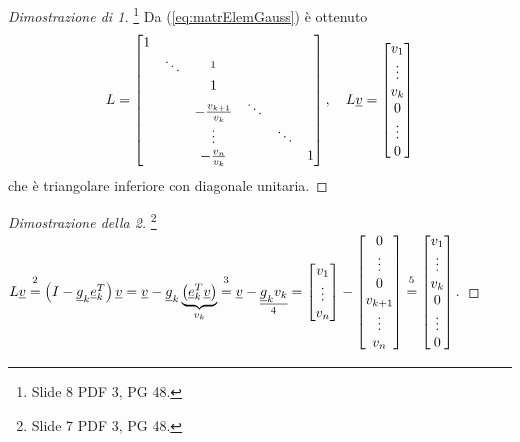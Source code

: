 \begin{proof}[Dimostrazione di 1]\footnote{Slide 8 PDF 3, PG 48.}
    Da (\ref{eq:matrElemGauss}) è ottenuto
    \begin{equation*}
        L = \begin{bmatrix}
            1 \\
            & \ddots & \footnotemark \\
            & & 1\\
            & & -\frac{v_{k+1}}{v_k}&\ddots\\
            & & \vdots & &\ddots\\
            & & -\frac{v_n}{v_k} & & & 1\\
        \end{bmatrix},\quad L\uline v=\begin{bmatrix}
            v_1\\
            \vdots\\
            v_k\\
            0\\
            \vdots\\
            0
        \end{bmatrix}
    \end{equation*}
    che è triangolare inferiore con diagonale unitaria.
\end{proof}

\begin{proof}[Dimostrazione della 2]\footnote{Slide 7 PDF 3, PG 48.}
    $L\uline v\overset{\footnotemark}{=}\left(I-\uline g_k \uline e_k^T\right)\uline v= \uline v-\uline g_k\underbrace{\left(\uline e_k^T\uline v\right)}_{v_k} \overset{\footnotemark}{=}\uline v - \underset{\footnotemark}{\uline{\uline g_k v_k}}=\begin{bmatrix}
        v_1\\
        \vdots\\
        v_n
    \end{bmatrix}-
    \begin{bmatrix}
        0\\
        \vdots\\
        0\\
        v_{k+1}\\
        \vdots\\
        v_n
    \end{bmatrix}\overset{\footnotemark}{=}\begin{bmatrix}
        v_1\\
        \vdots\\
        v_k\\
        0\\
        \vdots\\
        0
    \end{bmatrix}.$
\end{proof}


